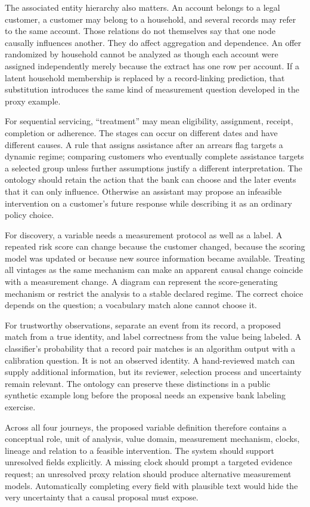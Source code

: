 The associated entity hierarchy also matters. An account belongs to a
legal customer, a customer may belong to a household, and several
records may refer to the same account. Those relations do not themselves
say that one node causally influences another. They do affect
aggregation and dependence. An offer randomized by household cannot be
analyzed as though each account were assigned independently merely
because the extract has one row per account. If a latent household
membership is replaced by a record-linking prediction, that substitution
introduces the same kind of measurement question developed in the proxy
example.

For sequential servicing, ``treatment'' may mean eligibility,
assignment, receipt, completion or adherence. The stages can occur on
different dates and have different causes. A rule that assigns
assistance after an arrears flag targets a dynamic regime; comparing
customers who eventually complete assistance targets a selected group
unless further assumptions justify a different interpretation. The
ontology should retain the action that the bank can choose and the later
events that it can only influence. Otherwise an assistant may propose an
infeasible intervention on a customer's future response while describing
it as an ordinary policy choice.

For discovery, a variable needs a measurement protocol as well as a
label. A repeated risk score can change because the customer changed,
because the scoring model was updated or because new source information
became available. Treating all vintages as the same mechanism can make
an apparent causal change coincide with a measurement change. A diagram
can represent the score-generating mechanism or restrict the analysis to
a stable declared regime. The correct choice depends on the question; a
vocabulary match alone cannot choose it.

For trustworthy observations, separate an event from its record, a
proposed match from a true identity, and label correctness from the
value being labeled. A classifier's probability that a record pair
matches is an algorithm output with a calibration question. It is not an
observed identity. A hand-reviewed match can supply additional
information, but its reviewer, selection process and uncertainty remain
relevant. The ontology can preserve these distinctions in a public
synthetic example long before the proposal needs an expensive bank
labeling exercise.

Across all four journeys, the proposed variable definition therefore
contains a conceptual role, unit of analysis, value domain, measurement
mechanism, clocks, lineage and relation to a feasible intervention. The
system should support unresolved fields explicitly. A missing clock
should prompt a targeted evidence request; an unresolved proxy relation
should produce alternative measurement models. Automatically completing
every field with plausible text would hide the very uncertainty that a
causal proposal must expose.

